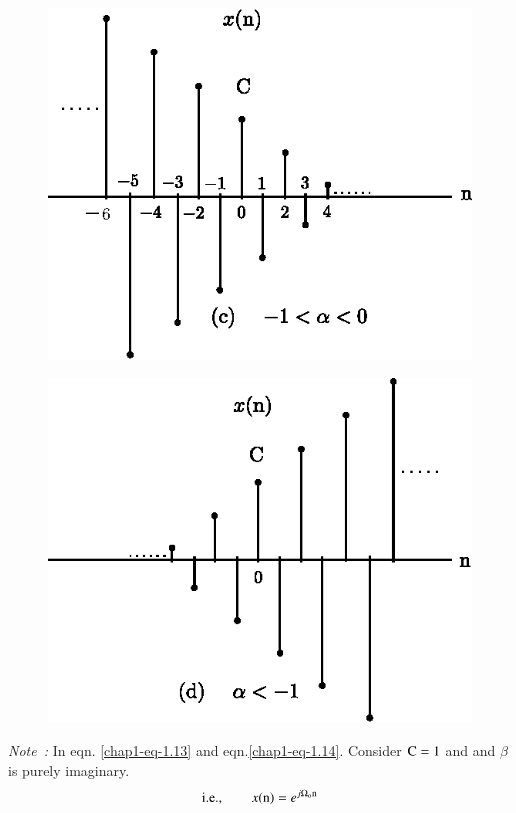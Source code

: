 \begin{figure}[H]
\centering
\includegraphics{src/chap1/fig.1.15(c).eps}
\end{figure}
\setcounter{figure}{14}
\begin{figure}[H]
\centering
\includegraphics{src/chap1/fig.1.15(d).eps}
\caption{}\label{chap1-fig-1.15}
\end{figure}
\noindent
\textit{Note~:} In eqn. \ref{chap1-eq-1.13} and eqn.\ref{chap1-eq-1.14}. Consider $\textrm{C}=1$ and and $\beta$ is purely imaginary.
\begin{equation}
\text{i.e.}, \qquad  x(\textrm{n})= e^{j\Omega_{\textrm{o}}\textrm{n}}\label{chap1-eq-1.15}
\end{equation} 

